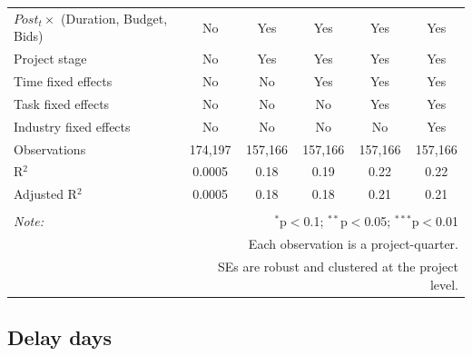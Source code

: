 \documentclass[
]{article}
\begin{document}
\begin{table}[H]
\begin{tabular}{@{\extracolsep{-2pt}}lccccc}
$Post_t \times$  (Duration, Budget, Bids) & No & Yes & Yes & Yes & Yes \\ 
Project stage & No & Yes & Yes & Yes & Yes \\ 
Time fixed effects & No & No & Yes & Yes & Yes \\ 
Task fixed effects & No & No & No & Yes & Yes \\ 
Industry fixed effects & No & No & No & No & Yes \\ 
Observations & 174,197 & 157,166 & 157,166 & 157,166 & 157,166 \\ 
R$^{2}$ & 0.0005 & 0.18 & 0.19 & 0.22 & 0.22 \\ 
Adjusted R$^{2}$ & 0.0005 & 0.18 & 0.18 & 0.21 & 0.21 \\ 
\hline 
\hline \\[-1.8ex] 
\textit{Note:}  & \multicolumn{5}{r}{$^{*}$p$<$0.1; $^{**}$p$<$0.05; $^{***}$p$<$0.01} \\ 
 & \multicolumn{5}{r}{Each observation is a project-quarter.} \\ 
 & \multicolumn{5}{r}{SEs are robust and clustered at the project level.} \\ 
\end{tabular} 
\end{table}

\hypertarget{delay-days}{%
\subsection{Delay days}\label{delay-days}}
\end{document}
